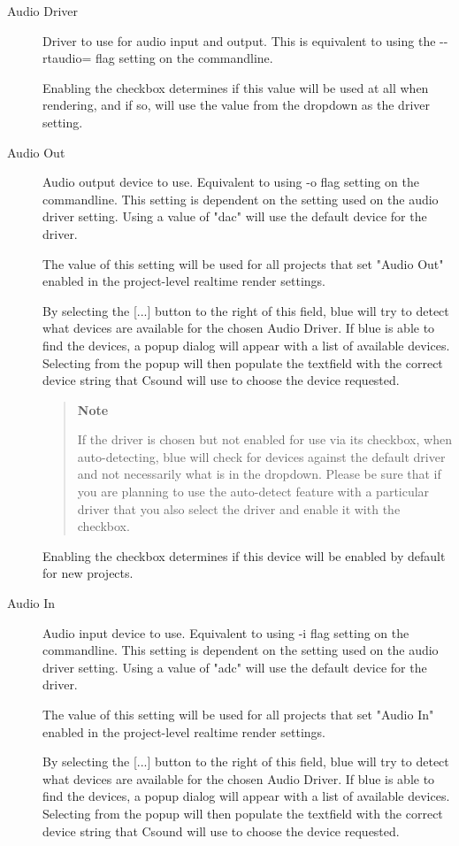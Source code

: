 \begin{description}
\item[Audio Driver]
Driver to use for audio input and output. This is equivalent to using
the -\/-rtaudio= flag setting on the commandline.

Enabling the checkbox determines if this value will be used at all when
rendering, and if so, will use the value from the dropdown as the driver
setting.
\item[Audio Out]
Audio output device to use. Equivalent to using -o flag setting on the
commandline. This setting is dependent on the setting used on the audio
driver setting. Using a value of "dac" will use the default device for
the driver.

The value of this setting will be used for all projects that set "Audio
Out" enabled in the project-level realtime render settings.

By selecting the {[}...{]} button to the right of this field, blue will
try to detect what devices are available for the chosen Audio Driver. If
blue is able to find the devices, a popup dialog will appear with a list
of available devices. Selecting from the popup will then populate the
textfield with the correct device string that Csound will use to choose
the device requested.

\begin{quote}
\textbf{Note}

If the driver is chosen but not enabled for use via its checkbox, when
auto-detecting, blue will check for devices against the default driver
and not necessarily what is in the dropdown. Please be sure that if you
are planning to use the auto-detect feature with a particular driver
that you also select the driver and enable it with the checkbox.
\end{quote}

Enabling the checkbox determines if this device will be enabled by
default for new projects.
\item[Audio In]
Audio input device to use. Equivalent to using -i flag setting on the
commandline. This setting is dependent on the setting used on the audio
driver setting. Using a value of "adc" will use the default device for
the driver.

The value of this setting will be used for all projects that set "Audio
In" enabled in the project-level realtime render settings.

By selecting the {[}...{]} button to the right of this field, blue will
try to detect what devices are available for the chosen Audio Driver. If
blue is able to find the devices, a popup dialog will appear with a list
of available devices. Selecting from the popup will then populate the
textfield with the correct device string that Csound will use to choose
the device requested.


\end{description}
